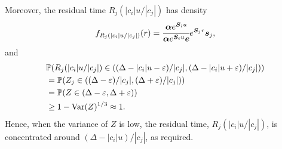 
Moreover, the residual time \(R_j(|c_i|u/|c_j|)\) has density 
\[f_{R_j(|c_i|u/|c_j|)}(r) = \cfrac{\boldsymbol\alpha e^{\boldsymbol S_iu } }{\boldsymbol\alpha e^{\boldsymbol S_iu } \boldsymbol e}e^{\boldsymbol S_j r}\boldsymbol s_j,\]
and 
\begin{align}
	&\mathbb P(R_j(|c_i|u/|c_j|) \in{}((\Delta-|c_i|u-\varepsilon)/|c_j|, (\Delta-|c_i|u + \varepsilon)/|c_j| )) \nonumber
	\\&=\mathbb P(Z_j\in{}((\Delta-\varepsilon)/|c_j|, (\Delta + \varepsilon)/|c_j|)) 
	\\&=\mathbb P(Z\in{}(\Delta-\varepsilon ,  \Delta + \varepsilon )) 
	\\&\geq 1-\mathrm{Var}(Z)^{1/3} \approx 1.
\end{align}
Hence, when the variance of \(Z\) is low, the residual time, \(R_j(|c_i|u/|c_j|)\), is concentrated around \((\Delta - |c_i|u)/|c_j|\), as required. 


